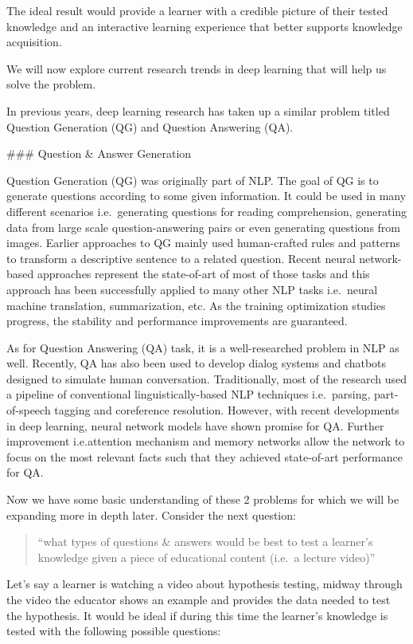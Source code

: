\documentclass[]{book}
\theoremstyle{definition}
\theoremstyle{definition}
\theoremstyle{definition}
\theoremstyle{remark}
\begin{document}
The ideal result would provide a learner with a credible picture of
their tested knowledge and an interactive learning experience that
better supports knowledge acquisition.

We will now explore current research trends in deep learning that will
help us solve the problem.

In previous years, deep learning research has taken up a similar problem
titled Question Generation (QG) and Question Answering (QA).

\#\#\# Question \& Answer Generation

Question Generation (QG) was originally part of NLP. The goal of QG is
to generate questions according to some given information. It could be
used in many different scenarios i.e.~generating questions for reading
comprehension, generating data from large scale question-answering pairs
or even generating questions from images. Earlier approaches to QG
mainly used human-crafted rules and patterns to transform a descriptive
sentence to a related question. Recent neural network-based approaches
represent the state-of-art of most of those tasks and this approach has
been successfully applied to many other NLP tasks i.e.~neural machine
translation, summarization, etc. As the training optimization studies
progress, the stability and performance improvements are guaranteed.

As for Question Answering (QA) task, it is a well-researched problem in
NLP as well. Recently, QA has also been used to develop dialog systems
and chatbots designed to simulate human conversation. Traditionally,
most of the research used a pipeline of conventional
linguistically-based NLP techniques i.e.~parsing, part-of-speech tagging
and coreference resolution. However, with recent developments in deep
learning, neural network models have shown promise for QA. Further
improvement i.e.attention mechanism and memory networks allow the
network to focus on the most relevant facts such that they achieved
state-of-art performance for QA.

Now we have some basic understanding of these 2 problems for which we
will be expanding more in depth later. Consider the next question:

\begin{quote}
``what types of questions \& answers would be best to test a learner's
knowledge given a piece of educational content (i.e.~a lecture video)''
\end{quote}

Let's say a learner is watching a video about hypothesis testing, midway
through the video the educator shows an example and provides the data
needed to test the hypothesis. It would be ideal if during this time the
learner's knowledge is tested with the following possible questions:
\end{document}
